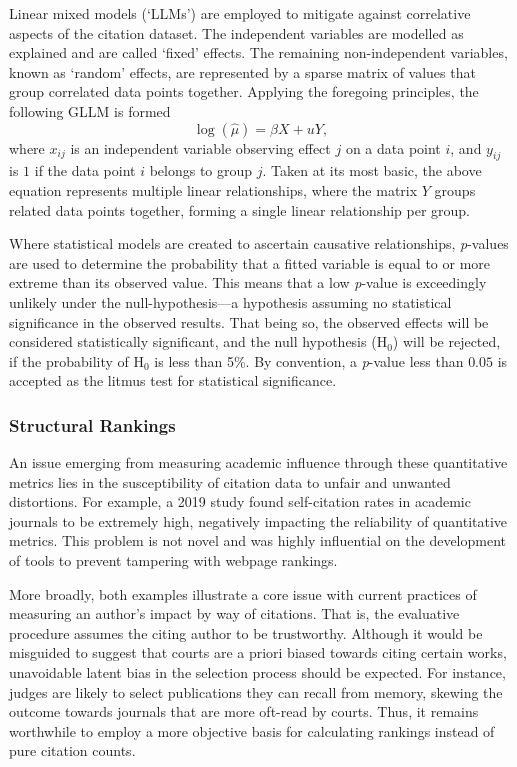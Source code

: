 Linear mixed models (`LLMs') are employed to mitigate against correlative aspects of the citation dataset. The independent variables are modelled as explained and are called `fixed' effects. The remaining non-independent variables, known as `random' effects, are represented by a sparse matrix of values that group correlated data points together. Applying the foregoing principles, the following GLLM is formed \[\log(\hat{\mu}) = \beta X + u Y,\] where $x_{ij}$ is an independent variable observing effect $j$ on a data point $i$, and $y_{ij}$ is $1$ if the data point $i$ belongs to group $j$. Taken at its most basic, the above equation represents multiple linear relationships, where the matrix $Y$ groups related data points together, forming a single linear relationship per group.

Where statistical models are created to ascertain causative relationships, \textit{p}-values are used to determine the probability that a fitted variable is equal to or more extreme than its observed value. This means that a low \textit{p}-value is exceedingly unlikely under the null-hypothesis---a hypothesis assuming no statistical significance in the observed results. That being so, the observed effects will be considered statistically significant, and the null hypothesis ($\mathrm{H}_0$) will be rejected, if the probability of $\mathrm{H}_0$ is less than 5\%. By convention, a \textit{p}-value less than $0.05$ is accepted as the litmus test for statistical significance.

\subsubsection{Structural Rankings}
An issue emerging from measuring academic influence through these quantitative metrics lies in the susceptibility of citation data to unfair and unwanted distortions. For example, a 2019 study found self-citation rates in academic journals to be extremely high, negatively impacting the reliability of quantitative metrics.\xn{} This problem is not novel and was highly influential on the development of tools to prevent tampering with webpage rankings.\xn{} 

More broadly, both examples illustrate a core issue with current practices of measuring an author's impact by way of citations. That is, the evaluative procedure assumes the citing author to be trustworthy. Although it would be misguided to suggest that courts are a priori biased towards citing certain works, unavoidable latent bias in the selection process should be expected. For instance, judges are likely to select publications they can recall from memory, skewing the outcome towards journals that are more oft-read by courts.\xn{} Thus, it remains worthwhile to employ a more objective basis for calculating rankings instead of pure citation counts.

